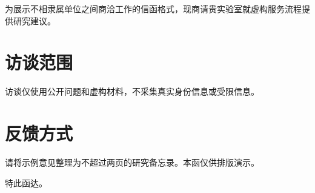 \documentclass{sysuredhead}
\begin{document}
\RedHeadMakeHead

为展示不相隶属单位之间商洽工作的信函格式，现商请贵实验室就虚构服务流程提供研究建议。

\section{访谈范围}

访谈仅使用公开问题和虚构材料，不采集真实身份信息或受限信息。

\section{反馈方式}

请将示例意见整理为不超过两页的研究备忘录。本函仅供排版演示。

特此函达。

\RedHeadMakeClosing
\end{document}
